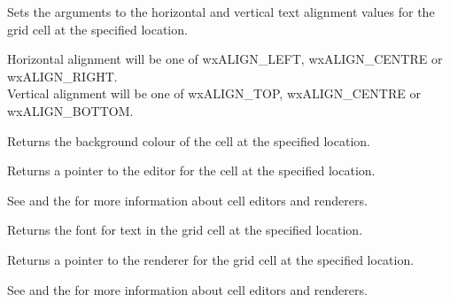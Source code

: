 \label{wxgridgetcellalignment}


Sets the arguments to the horizontal and vertical text alignment values for the
grid cell at the specified location.

Horizontal alignment will be one of wxALIGN_LEFT, wxALIGN_CENTRE or wxALIGN_RIGHT. \\
Vertical alignment will be one of wxALIGN_TOP, wxALIGN_CENTRE or wxALIGN_BOTTOM.

\label{wxgridgetcellbackgroundcolour}


Returns the background colour of the cell at the specified location.

\label{wxgridgetcelleditor}


Returns a pointer to the editor for the cell at the specified location.

See  and
the  for more information about cell editors and renderers.

\label{wxgridgetcellfont}


Returns the font for text in the grid cell at the specified location.

\label{wxgridgetcellrenderer}


Returns a pointer to the renderer for the grid cell at the specified location.

See  and
the  for more information about cell editors and renderers.

\label{wxgridgetcelltextcolour}


